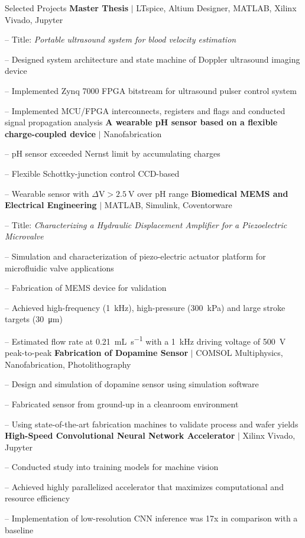 
\begin{rubric}{\faTasks[solid]  Selected Projects}
\entry*[2023][]%
	\textbf{Master Thesis} $|$ LTspice, Altium Designer, MATLAB, Xilinx Vivado, Jupyter \par
	-- Title: \emph{Portable ultrasound system for blood velocity estimation} \par
	-- Designed system architecture and state machine of Doppler ultrasound imaging device \par
	-- Implemented Zynq 7000 FPGA bitstream for ultrasound pulser control system \par
	-- Implemented MCU/FPGA interconnects, registers and flags and conducted signal propagation analysis
%
\entry*[2023][] \textbf{A wearable pH sensor based on a flexible charge-coupled device} $|$ Nanofabrication \par
	-- pH sensor exceeded Nernst limit by accumulating charges \par
	-- Flexible Schottky-junction control CCD-based \par
	-- Wearable sensor with $\Delta \unit{\volt}>\qty{2.5}{\volt}$ over pH range
%
\entry*[2022][] \textbf{Biomedical MEMS and Electrical Engineering} $|$ MATLAB, Simulink, Coventorware \par
	-- Title: \emph{Characterizing a Hydraulic Displacement Amplifier for a Piezoelectric Microvalve} \par
	-- Simulation and characterization of piezo-electric actuator platform for microfluidic valve applications \par
	-- Fabrication of MEMS device for validation \par
	-- Achieved high-frequency (\qty{1}{\kilo\hertz}), high-pressure (\qty{300}{\kilo\pascal}) and large stroke targets (\qty{30}{\micro\meter}) \par
	-- Estimated flow rate at \qty{0.21}{\milli\liter\per\second} with a \qty{1}{\kilo\hertz} driving voltage of \qty{500}{\volt} peak-to-peak
%
\entry*[2021][] \textbf{Fabrication of Dopamine Sensor} $|$ COMSOL Multiphysics, Nanofabrication, Photolithography \par
	-- Design and simulation of dopamine sensor using simulation software \par
	-- Fabricated sensor from ground-up in a cleanroom environment \par
	-- Using state-of-the-art fabrication machines to validate process and wafer yields
%
\entry*[2020][] \textbf{High-Speed Convolutional Neural Network Accelerator} $|$ Xilinx Vivado, Jupyter \par
	-- Conducted study into training models for machine vision \par
	-- Achieved highly parallelized accelerator that maximizes computational and resource efficiency \par
	-- Implementation of low-resolution CNN inference was 17x in comparison with a baseline
\end{rubric}